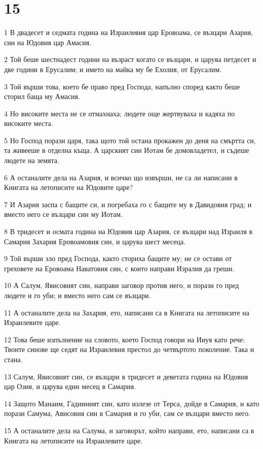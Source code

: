 \chapter{15}

\par 1 В двадесет и седмата година на Израилевия цар Еровоама, се възцари Азария, син на Юдовия цар Амасия.
\par 2 Той беше шестнадест години на възраст когато се възцари, и царува петдесет и две години в Ерусалим; и името на майка му бе Ехолия, от Ерусалим.
\par 3 Той върши това, което бе право пред Господа, напълно според както беше сторил баща му Амасия.
\par 4 Но високите места не се отмахнаха; людете още жертвуваха и кадяха по високите места.
\par 5 Но Господ порази царя, така щото той остана прокажен до деня на смъртта си, та живееше в отделна къща. А царският син Иотам бе домовладетел, и съдеше людете на земята.
\par 6 А останалите дела на Азария, и всичко що извърши, не са ли написани в Книгата на летописите на Юдовите царе?
\par 7 И Азария заспа с бащите си, и погребаха го с бащите му в Давидовия град; и вместо него се възцари син му Иотам.
\par 8 В тридесет и осмата година на Юдовия цар Азария, се възцари над Израиля в Самария Захария Еровоамовия син, и царува шест месеца.
\par 9 Той върши зло пред Господа, както сториха бащите му; не се остави от греховете на Еровоама Наватовия син, с които направи Изралия да греши.
\par 10 А Салум, Явисовият син, направи заговор против него, и порази го пред людете и го уби; и вместо него сам се възцари.
\par 11 А останалите дела на Захария, ето, написани са в Книгата на летописите на Израилевите царе.
\par 12 Това беше изпълнение на словото, което Господ говори на Ииуя като рече: Твоите синове ще седят на Израилевия престол до четвъртото поколение. Така и стана.
\par 13 Салум, Явисовият син, се възцари в тридесет и деветата година на Юдовия цар Озия, и царува един месец в Самария.
\par 14 Защото Манаим, Гадииният син, като излезе от Терса, дойде в Самария, и като порази Самума, Ависовия син в Самария и го уби, сам се възцари вместо него.
\par 15 А останалите дела на Салума, и заговорът, който направи, ето, написани са в Книгата на летописите на Израилевите царе.

